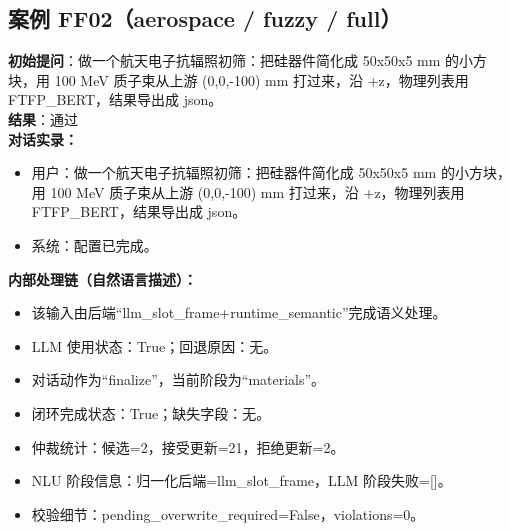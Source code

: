 \documentclass[11pt]{ctexart}
\begin{document}
\subsection{案例 FF02（aerospace / fuzzy / full）}
\textbf{初始提问}：做一个航天电子抗辐照初筛：把硅器件简化成 50x50x5 mm 的小方块，用 100 MeV 质子束从上游 (0,0,-100) mm 打过来，沿 +z，物理列表用 FTFP\_BERT，结果导出成 json。\\
\textbf{结果}：通过\\
\textbf{对话实录：}
\begin{itemize}
\item 用户：做一个航天电子抗辐照初筛：把硅器件简化成 50x50x5 mm 的小方块，用 100 MeV 质子束从上游 (0,0,-100) mm 打过来，沿 +z，物理列表用 FTFP\_BERT，结果导出成 json。
\item 系统：配置已完成。
\end{itemize}
\textbf{内部处理链（自然语言描述）：}
\begin{itemize}
\item 该输入由后端“llm\_slot\_frame+runtime\_semantic”完成语义处理。
\item LLM 使用状态：True；回退原因：无。
\item 对话动作为“finalize”，当前阶段为“materials”。
\item 闭环完成状态：True；缺失字段：无。
\item 仲裁统计：候选=2，接受更新=21，拒绝更新=2。
\item NLU 阶段信息：归一化后端=llm\_slot\_frame，LLM 阶段失败=[]。
\item 校验细节：pending\_overwrite\_required=False，violations=0。
\end{itemize}
\end{document}

